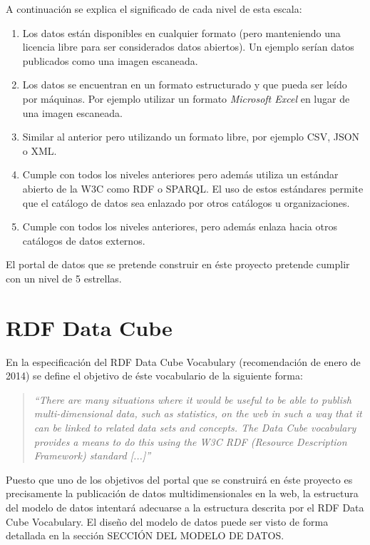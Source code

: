 A continuación se explica el significado de cada nivel de esta escala:
\begin{enumerate}
    \item Los datos están disponibles en cualquier formato (pero manteniendo una licencia libre para ser considerados datos abiertos).  Un ejemplo serían datos publicados como una imagen escaneada.
    \item Los datos se encuentran en un formato estructurado y que pueda ser leído por máquinas.  Por ejemplo utilizar un formato \textit{Microsoft Excel} en lugar de una imagen escaneada.
    \item Similar al anterior pero utilizando un formato libre, por ejemplo CSV, JSON o XML.
    \item Cumple con todos los niveles anteriores pero además utiliza un estándar abierto de la W3C como RDF o SPARQL.  El uso de estos estándares permite que el catálogo de datos sea enlazado por otros catálogos u organizaciones.
    \item Cumple con todos los niveles anteriores, pero además enlaza hacia otros catálogos de datos externos.
\end{enumerate}

El portal de datos que se pretende construir en éste proyecto pretende cumplir con un nivel de 5 estrellas.



\section{RDF Data Cube}
\label{concept:rdf_data_cube}
En la especificación del RDF Data Cube Vocabulary (recomendación de enero de 2014) \cite{w3c:data-cube} se define el objetivo de éste vocabulario de la siguiente forma:
\begin{quote}
\textit{``There are many situations where it would be useful to be able to publish multi-dimensional data, such as statistics, on the web in such a way that it can be linked to related data sets and concepts. The Data Cube vocabulary provides a means to do this using the W3C RDF (Resource Description Framework) standard [...]''}
\end{quote}

Puesto que uno de los objetivos del portal que se construirá en éste proyecto es precisamente la publicación de datos multidimensionales en la web, la estructura del modelo de datos intentará adecuarse a la estructura descrita por el RDF Data Cube Vocabulary.  El diseño del modelo de datos puede ser visto de forma detallada en la sección SECCIÓN DEL MODELO DE DATOS.


